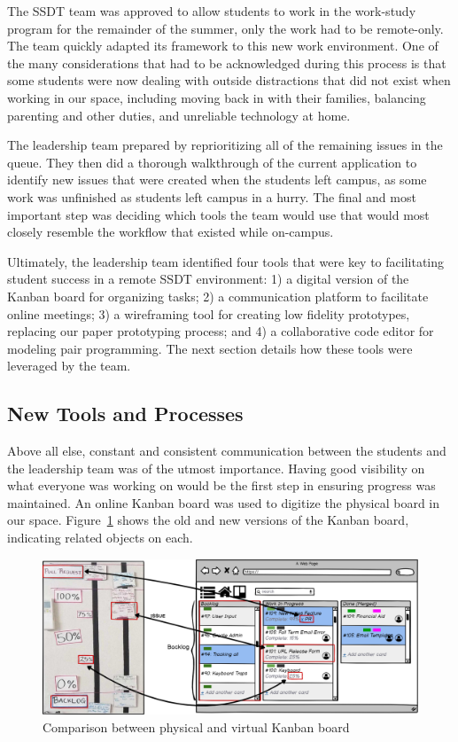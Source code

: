 The SSDT team was approved to allow students to work in the work-study program for the remainder of the summer, only the work had to be remote-only. The team quickly adapted its framework to this new work environment. One of the many considerations that had to be acknowledged during this process is that some students were now dealing with outside distractions that did not exist when working in our space, including moving back in with their families, balancing parenting and other duties, and unreliable technology at home.

The leadership team prepared by reprioritizing all of the remaining issues in the queue. They then did a thorough walkthrough of the current application to identify new issues that were created when the students left campus, as some work was unfinished as students left campus in a hurry. The final and most important step was deciding which tools the team would use that would most closely resemble the workflow that existed while on-campus.

Ultimately, the leadership team identified four tools that were key to facilitating student success in a remote SSDT environment: 1) a digital version of the Kanban board for organizing tasks; 2) a communication platform to facilitate online meetings; 3) a wireframing tool for creating low fidelity prototypes, replacing our paper prototyping process; and 4) a collaborative code editor for modeling pair programming. The next section details how these tools were leveraged by the team.

\subsection{New Tools and Processes}
Above all else, constant and consistent communication between the students and the leadership team was of the utmost importance. Having good visibility on what everyone was working on would be the first step in ensuring progress was maintained. An online Kanban board was used to digitize the physical board in our space. Figure~\ref{fig:digitalkanban} shows the old and new versions of the Kanban board, indicating related objects on each.

\begin{figure}[h]
 \centering
 \includegraphics[width=\linewidth]{newTrellomockup2.png}
 \caption{Comparison between physical and virtual Kanban board}
 \label{fig:digitalkanban}
\end{figure}

